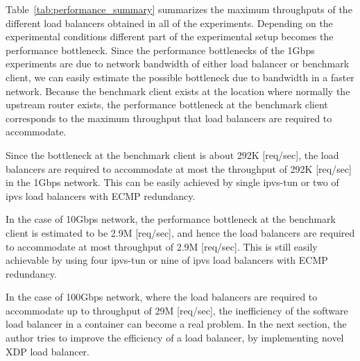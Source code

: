 Table~\ref{tab:performance_summary} summarizes the maximum throughputs of the different load balancers obtained in all of the experiments.
Depending on the experimental conditions different part of the experimental setup becomes the performance bottleneck.
Since the performance bottlenecks of the 1Gbps experiments are due to network bandwidth of either load balancer or benchmark client, we can easily estimate the possible bottleneck due to bandwidth in a faster network.
Because the benchmark client exists at the location where normally the upstream router exists, the performance bottleneck at the benchmark client corresponds to the maximum throughput that load balancers are required to accommodate.

Since the bottleneck at the benchmark client is about 292K [req/sec], the load balancers are required to accommodate at most the throughput of 292K [req/sec] in the 1Gbps network.
This can be easily achieved by single ipvs-tun or two of ipvs load balancers with ECMP redundancy.

In the case of 10Gbps network, the performance bottleneck at the benchmark client is estimated to be 2.9M [req/sec], and hence the load balancers are required to accommodate at most throughput of 2.9M [req/sec].
This is still easily achievable by using four ipvs-tun or nine of ipvs load balancers with ECMP redundancy.

In the case of 100Gbps network, where the load balancers are required to accommodate up to throughput of 29M [req/sec], the inefficiency of the software load balancer in a container can become a real problem.
In the next section, the author tries to improve the efficiency of a load balancer, by implementing novel XDP load balancer.

